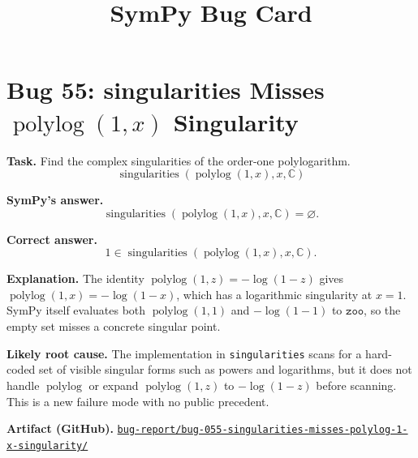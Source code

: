 \documentclass[11pt]{article}
\title{SymPy Bug Card}
\date{}
\newcommand{\artifactrepo}{https://github.com/TODO-org/TODO-repo}
\newcommand{\bugbundle}[1]{\href{\artifactrepo/tree/main/bug-report/#1}{\nolinkurl{bug-report/#1/}}}
\begin{document}
\author{}
\maketitle

\section*{Bug 55: \texorpdfstring{singularities Misses \(\operatorname{polylog}(1,x)\) Singularity}{singularities Misses polylog(1,x) Singularity}}

\begin{counterexamplebox}
\textbf{Task.} Find the complex singularities of the order-one polylogarithm.
\[
\operatorname{singularities}(\operatorname{polylog}(1,x),x,\mathbb{C})
\]

\medskip
\textbf{SymPy's answer.}
\[
\operatorname{singularities}(\operatorname{polylog}(1,x),x,\mathbb{C})=\varnothing .
\]

\medskip
\textbf{Correct answer.}
\[
1 \in \operatorname{singularities}(\operatorname{polylog}(1,x),x,\mathbb{C}) .
\]

\medskip
\textbf{Explanation.} The identity \(\operatorname{polylog}(1,z)=-\log(1-z)\) gives \(\operatorname{polylog}(1,x)=-\log(1-x)\), which has a logarithmic singularity at \(x=1\).  SymPy itself evaluates both \(\operatorname{polylog}(1,1)\) and \(-\log(1-1)\) to \(\mathtt{zoo}\), so the empty set misses a concrete singular point.

\medskip
\textbf{Likely root cause.} The implementation in \texttt{singularities} scans for a hard-coded set of visible singular forms such as powers and logarithms, but it does not handle \(\operatorname{polylog}\) or expand \(\operatorname{polylog}(1,z)\) to \(-\log(1-z)\) before scanning.  This is a new failure mode with no public precedent.

\medskip
\textbf{Artifact (GitHub).} \bugbundle{bug-055-singularities-misses-polylog-1-x-singularity}
\end{counterexamplebox}
\end{document}

